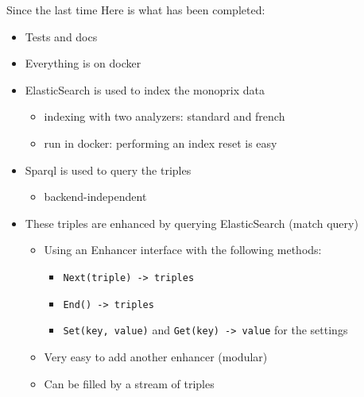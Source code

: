 \documentclass[10pt]{beamer}
\begin{document}
\begin{frame}{Since the last time}
    Here is what has been completed:
	\begin{itemize}
	    \item Tests and docs
		\item Everything is on docker
	    \item ElasticSearch is used to index the monoprix data
	    \begin{itemize}
	        \item indexing with two analyzers: standard and french
	        \item run in docker: performing an index reset is easy
	    \end{itemize}
	    \item Sparql is used to query the triples
	    \begin{itemize}
	        \item backend-independent
	    \end{itemize}
	    \item These triples are enhanced by querying ElasticSearch (match query)
	    \begin{itemize}
	        \item Using an Enhancer interface with the following methods:
	        \begin{itemize}
	            \item \texttt{Next(triple) -> triples}
	            \item \texttt{End() -> triples}
	            \item \texttt{Set(key, value)} and \texttt{Get(key) -> value} for the settings
	        \end{itemize}
	        \item Very easy to add another enhancer (modular)
	        \item Can be filled by a stream of triples
	    \end{itemize}
	\end{itemize}
\end{frame}
\end{document}
